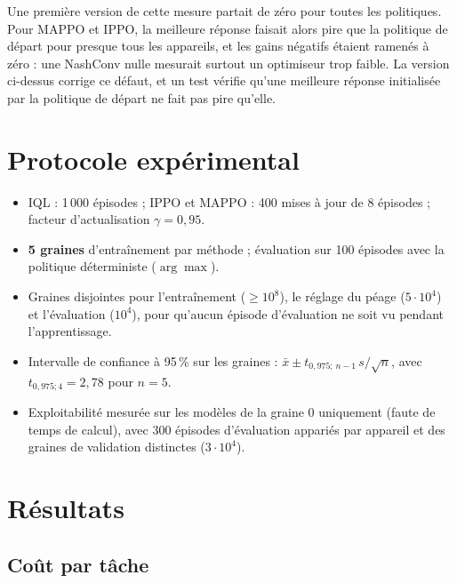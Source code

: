 \documentclass[11pt,a4paper]{article}
\begin{document}
Une première version de cette mesure partait de zéro pour toutes les politiques. Pour MAPPO et IPPO, la meilleure
réponse faisait alors pire que la politique de départ pour presque tous les appareils, et les gains négatifs
étaient ramenés à zéro : une NashConv nulle mesurait surtout un optimiseur trop faible. La version ci-dessus
corrige ce défaut, et un test vérifie qu'une meilleure réponse initialisée par la politique de départ ne fait pas
pire qu'elle.

\section{Protocole expérimental}

\begin{itemize}
  \item IQL : 1\,000 épisodes ; IPPO et MAPPO : 400 mises à jour de 8 épisodes ; facteur d'actualisation
        $\gamma=0{,}95$.
  \item \textbf{5 graines} d'entraînement par méthode ; évaluation sur 100 épisodes avec la politique
        déterministe ($\arg\max$).
  \item Graines disjointes pour l'entraînement ($\ge10^8$), le réglage du péage ($5\cdot10^4$) et l'évaluation
        ($10^4$), pour qu'aucun épisode d'évaluation ne soit vu pendant l'apprentissage.
  \item Intervalle de confiance à 95\,\% sur les graines : $\bar x \pm t_{0{,}975;\,n-1}\, s/\sqrt{n}$, avec
        $t_{0{,}975;4}=2{,}78$ pour $n=5$.
  \item Exploitabilité mesurée sur les modèles de la graine 0 uniquement (faute de temps de calcul), avec
        300 épisodes d'évaluation appariés par appareil et des graines de validation distinctes ($3\cdot10^4$).
\end{itemize}

\section{Résultats}

\subsection{Coût par tâche}
\end{document}
